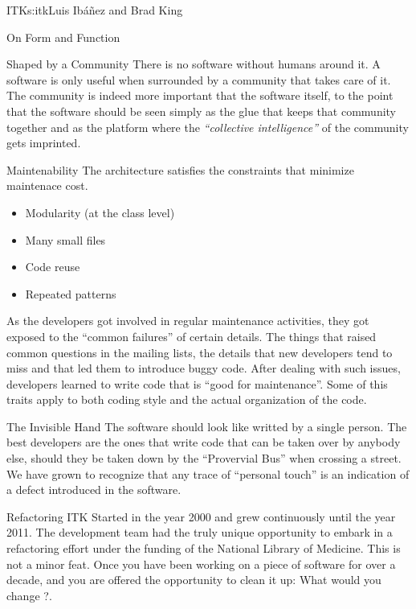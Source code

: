 \begin{aosachapter}{ITK}{s:itk}{Luis Ib\'{a}\~{n}ez and Brad King}
\begin{aosasect1}{On Form and Function}
\begin{aosasect2}{Shaped by a Community}
There is no software without humans around it. A software is only
useful when surrounded by a community that takes care of it. The
community is indeed more important that the software itself, to the
point that the software should be seen simply as the glue that keeps
that community together and as the platform where the \emph{``collective
intelligence''} of the community gets imprinted.
\end{aosasect2}

\begin{aosasect2}{Maintenability}
The architecture satisfies the constraints that minimize maintenace cost.
\begin{itemize}
\item Modularity (at the class level)
\item Many small files
\item Code reuse
\item Repeated patterns
\end{itemize}
\end{aosasect2}
As the developers got involved in regular maintenance activities, they
got exposed to the ``common failures'' of certain details. The things
that raised common questions in the mailing lists, the details that
new developers tend to miss and that led them to introduce buggy code.
After dealing with such issues, developers learned to write code that
is ``good for maintenance''. Some of this traits apply to both coding
style and the actual organization of the code.

\begin{aosasect2}{The Invisible Hand}
The software should look like writted by a single person. The best
developers are the ones that write code that can be taken over by
anybody else, should they be taken down by the ``Provervial Bus'' when
crossing a street. We have grown to recognize that any trace of
``personal touch'' is an indication of a defect introduced in the
software.
\end{aosasect2}

\end{aosasect1}

\begin{aosasect1}{Refactoring}
ITK Started in the year 2000 and grew continuously until the year
2011. The development team had the truly unique opportunity to embark
in a refactoring effort under the funding of the National Library of
Medicine. This is not a minor feat. Once you have been working on a
piece of software for over a decade, and you are offered the
opportunity to clean it up: What would you change ?.
\end{aosasect1}


\end{aosachapter}
